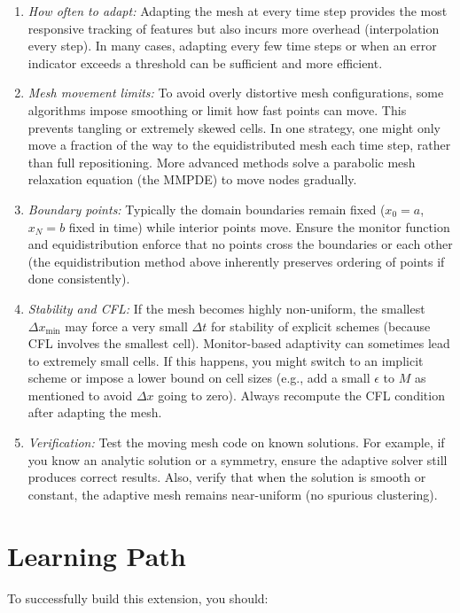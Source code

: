 \documentclass{adonis}
\begin{document}
\begin{enumerate}
    \item \textit{How often to adapt:} Adapting the mesh at every time step provides the most responsive tracking of features but also incurs more overhead (interpolation every step). In many cases, adapting every few time steps or when an error indicator exceeds a threshold can be sufficient and more efficient.
    \item \textit{Mesh movement limits:} To avoid overly distortive mesh configurations, some algorithms impose smoothing or limit how fast points can move. This prevents tangling or extremely skewed cells. In one strategy, one might only move a fraction of the way to the equidistributed mesh each time step, rather than full repositioning. More advanced methods solve a parabolic mesh relaxation equation (the MMPDE) to move nodes gradually.
    \item \textit{Boundary points:} Typically the domain boundaries remain fixed ($x_0=a$, $x_N=b$ fixed in time) while interior points move. Ensure the monitor function and equidistribution enforce that no points cross the boundaries or each other (the equidistribution method above inherently preserves ordering of points if done consistently).
    \item \textit{Stability and CFL:} If the mesh becomes highly non-uniform, the smallest $\Delta x_{\min}$ may force a very small $\Delta t$ for stability of explicit schemes (because CFL involves the smallest cell). Monitor-based adaptivity can sometimes lead to extremely small cells. If this happens, you might switch to an implicit scheme or impose a lower bound on cell sizes (e.g., add a small $\epsilon$ to $M$ as mentioned to avoid $\Delta x$ going to zero). Always recompute the CFL condition after adapting the mesh.
    \item \textit{Verification:} Test the moving mesh code on known solutions. For example, if you know an analytic solution or a symmetry, ensure the adaptive solver still produces correct results. Also, verify that when the solution is smooth or constant, the adaptive mesh remains near-uniform (no spurious clustering).
\end{enumerate}

\section{Learning Path}

To successfully build this extension, you should: 
\end{document}
